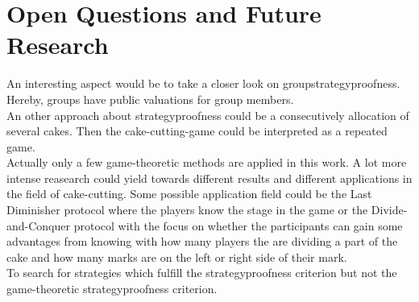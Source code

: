 \section{Open Questions and Future Research}
An interesting aspect would be to take a closer look on groupstrategyproofness. Hereby, groups have public valuations for group members.\\
\newline
An other approach about strategyproofness could be a consecutively allocation of several cakes. Then the cake-cutting-game could be interpreted as a repeated game. \\
Actually only a few game-theoretic methods are applied in this work. A lot more intense reasearch could yield towards different results and different applications in the field of cake-cutting. Some possible application field could be the Last Diminisher protocol where the players know the stage in the game or the Divide-and-Conquer protocol with the focus on whether the participants can gain some advantages from knowing with how many players the are dividing a part of the cake and how many marks are on the left or right side of their mark. \\
To search for strategies which fulfill the strategyproofness criterion but not the game-theoretic strategyproofness criterion.

\pagebreak


\clearpage


\thispagestyle{empty}
\pagestyle{plain}
\clearpage

\listoffigures

\listoftables
\thispagestyle{empty}
\pagestyle{plain}
